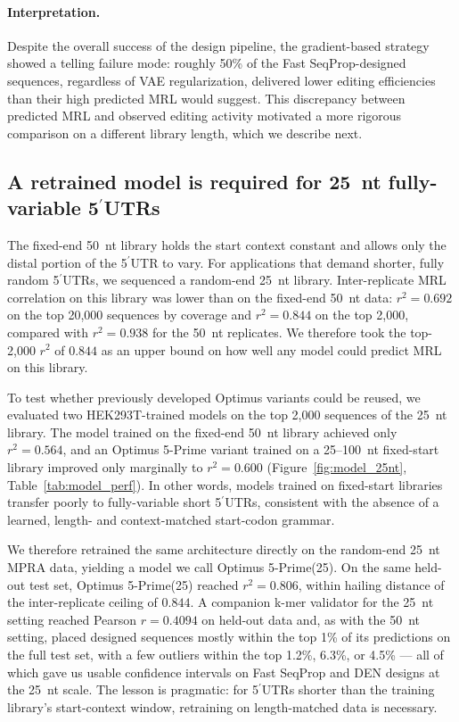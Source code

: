 \documentclass[11pt]{article}
\begin{document}
\paragraph{Interpretation.} Despite the overall success of the
design pipeline, the gradient-based strategy showed a telling failure
mode: roughly 50\% of the Fast SeqProp-designed sequences, regardless
of VAE regularization, delivered lower editing efficiencies than their
high predicted MRL would suggest. This discrepancy between predicted
MRL and observed editing activity motivated a more rigorous comparison
on a different library length, which we describe next.

\subsection{A retrained model is required for 25~nt fully-variable 5$^\prime$UTRs}

The fixed-end 50~nt library holds the start context constant and allows
only the distal portion of the 5$^\prime$UTR to vary. For applications
that demand shorter, fully random 5$^\prime$UTRs, we sequenced a
random-end 25~nt library. Inter-replicate MRL correlation on this
library was lower than on the fixed-end 50~nt data:
$r^{2} = 0.692$ on the top 20{,}000 sequences by coverage and
$r^{2} = 0.844$ on the top 2{,}000, compared with $r^{2} = 0.938$ for
the 50~nt replicates. We therefore took the top-2{,}000 $r^{2}$ of
$0.844$ as an upper bound on how well any model could predict MRL on
this library.

To test whether previously developed Optimus variants could be reused,
we evaluated two HEK293T-trained models on the top 2{,}000 sequences
of the 25~nt library. The model trained on the fixed-end 50~nt library
achieved only $r^{2} = 0.564$, and an Optimus 5-Prime variant trained
on a 25--100~nt fixed-start library improved only marginally to
$r^{2} = 0.600$ (Figure~\ref{fig:model_25nt},
Table~\ref{tab:model_perf}). In other words, models trained on
fixed-start libraries transfer poorly to fully-variable short
5$^\prime$UTRs, consistent with the absence of a learned, length- and
context-matched start-codon grammar.

We therefore retrained the same architecture directly on the random-end
25~nt MPRA data, yielding a model we call Optimus 5-Prime(25). On the
same held-out test set, Optimus 5-Prime(25) reached $r^{2} = 0.806$,
within hailing distance of the inter-replicate ceiling of $0.844$. A
companion k-mer validator for the 25~nt setting reached Pearson
$r = 0.4094$ on held-out data and, as with the 50~nt setting, placed
designed sequences mostly within the top 1\% of its predictions on the
full test set, with a few outliers within the top 1.2\%, 6.3\%, or 4.5\%
--- all of which gave us usable confidence intervals on Fast SeqProp
and DEN designs at the 25~nt scale. The lesson is pragmatic: for
5$^\prime$UTRs shorter than the training library's start-context window,
retraining on length-matched data is necessary.
\end{document}
